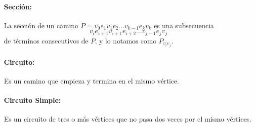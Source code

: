 \paragraph{Sección:} La sección de un camino \(P = v_0e_1v_1e_2\dots v_{k-1}e_kv_k\) es una subsecuencia \[v_ie_{i+1}v_{i+1}e_{i+2}\dots v_{j-1}e_jv_j\] de términos consecutivos de \(P\), y lo notamos como \(P_{v_iv_j}\).

\paragraph{Circuito:} Es un camino que empieza y termina en el mismo vértice.

\paragraph{Circuito Simple:} Es un circuito de tres o más vértices que no pasa dos veces por el mismo vértices.

